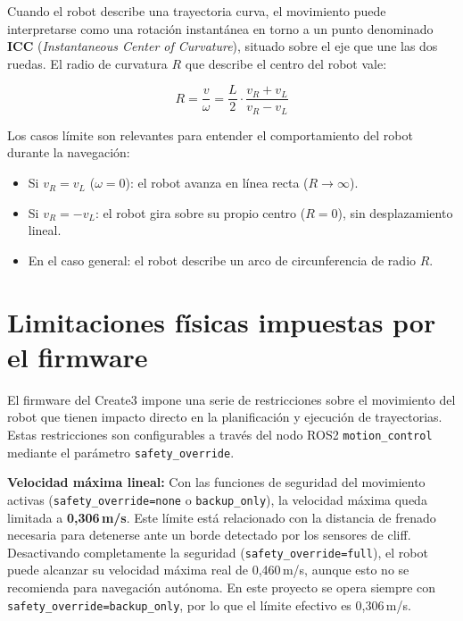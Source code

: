 Cuando el robot describe una trayectoria curva, el movimiento puede interpretarse como una rotación instantánea en torno a un punto denominado \textbf{ICC} (\textit{Instantaneous Center of Curvature}), situado sobre el eje que une las dos ruedas. El radio de curvatura $R$ que describe el centro del robot vale:

\begin{equation}
    R = \frac{v}{\omega} = \frac{L}{2} \cdot \frac{v_R + v_L}{v_R - v_L}
    \label{eq:radio}
\end{equation}

Los casos límite son relevantes para entender el comportamiento del robot durante la navegación:

\begin{itemize}
    \item Si $v_R = v_L$ ($\omega = 0$): el robot avanza en línea recta ($R \to \infty$).
    \item Si $v_R = -v_L$: el robot gira sobre su propio centro ($R = 0$), sin desplazamiento lineal.
    \item En el caso general: el robot describe un arco de circunferencia de radio $R$.
\end{itemize}

\section{Limitaciones físicas impuestas por el firmware}

El firmware del Create3 impone una serie de restricciones sobre el movimiento del robot que tienen impacto directo en la planificación y ejecución de trayectorias. Estas restricciones son configurables a través del nodo ROS2 \texttt{motion\_control} mediante el parámetro \texttt{safety\_override}\cite{create3_docs}\cite{create3_sim}.

\textbf{Velocidad máxima lineal:} Con las funciones de seguridad del movimiento activas (\texttt{safety\_override=none} o \texttt{backup\_only}), la velocidad máxima queda limitada a \textbf{0,306\,m/s}. Este límite está relacionado con la distancia de frenado necesaria para detenerse ante un borde detectado por los sensores de cliff. Desactivando completamente la seguridad (\texttt{safety\_override=full}), el robot puede alcanzar su velocidad máxima real de 0,460\,m/s, aunque esto no se recomienda para navegación autónoma. En este proyecto se opera siempre con \texttt{safety\_override=backup\_only}, por lo que el límite efectivo es 0,306\,m/s.

